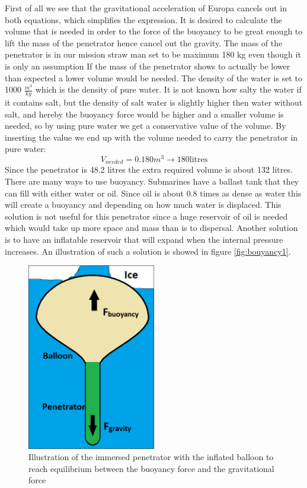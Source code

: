 First of all we see that the gravitational acceleration of Europa cancels out in both equations, which simplifies the expression. It is desired to calculate the volume that is needed in order to the force of the buoyancy to be great enough to lift the mass of the penetrator hence cancel out the gravity. The mass of the penetrator is in our mission straw man set to be maximum 180 kg even though it is only an assumption  If the mass of the penetrator shows to actually be lower than expected a lower volume would be needed. The density of the water is set to 1000 $\frac{m^3}{kg}$ which is the density of pure water. It is not known how salty the water if it contains salt, but the density of salt water is slightly higher then water without salt, and hereby the buoyancy force would be higher and a smaller volume is needed, so by using pure water we get a conservative value of the volume. By inserting the value we end up with the volume needed to carry the penetrator in pure water:
\begin{equation}
V_{needed} = 0.180 m^3 \rightarrow 180 \text{litres}
\end{equation}
Since the penetrator is 48.2 litres the extra required volume is about 132 litres. There are many ways to use buoyancy. Submarines have a ballast tank that they can fill with either water or oil. Since oil is about 0.8 times as dense as water this will create a buoyancy and depending on how much water is displaced. This solution is not useful for this penetrator since a huge reservoir of oil is needed which would take up more space and mass than is to dispersal. Another solution is to have an inflatable reservoir that will expand when the internal pressure increases. An illustration of such a solution is showed in figure \ref{fig:bouyancy1}.
\begin{figure}[htb]
  \centering
  \includegraphics[width=0.5\textwidth]{figures/Ricardo/Buoyancy1.png}
  \caption{Illustration of the immersed penetrator with the inflated balloon to reach equilibrium between the buoyancy force and the gravitational force}
  \label{fig:buoyancy1}
\end{figure}
